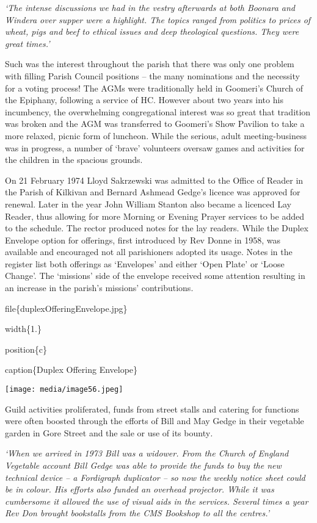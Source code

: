 \emph{`The intense discussions we had in the vestry afterwards at both Boonara and Windera over supper were a highlight. The topics ranged from politics to prices of wheat, pigs and beef to ethical issues and deep theological questions. They were great times.'}

Such was the interest throughout the parish that there was only one problem with filling Parish Council positions -- the many nominations and the necessity for a voting process! The AGMs were traditionally held in Goomeri's Church of the Epiphany, following a service of HC. However about two years into his incumbency, the overwhelming congregational interest was so great that tradition was broken and the AGM was transferred to Goomeri's Show Pavilion to take a more relaxed, picnic form of luncheon. While the serious, adult meeting-business was in progress, a number of `brave' volunteers oversaw games and activities for the children in the spacious grounds.

On 21 February 1974 Lloyd Sakrzewski was admitted to the Office of Reader in the Parish of Kilkivan and Bernard Ashmead Gedge's licence was approved for renewal. Later in the year John William Stanton also became a licenced Lay Reader, thus allowing for more Morning or Evening Prayer services to be added to the schedule. The rector produced notes for the lay readers. While the Duplex Envelope option for offerings, first introduced by Rev Donne in 1958, was available and encouraged not all parishioners adopted its usage. Notes in the register list both offerings as `Envelopes' and either `Open Plate' or `Loose Change'. The `missions' side of the envelope received some attention resulting in an increase in the parish's missions' contributions.

file\{duplexOfferingEnvelope.jpg\}

width\{1.\}

position\{c\}

caption\{Duplex Offering Envelope\}

\texttt{[image: media/image56.jpeg]}

Guild activities proliferated, funds from street stalls and catering for functions were often boosted through the efforts of Bill and May Gedge in their vegetable garden in Gore Street and the sale or use of its bounty\emph{.}

\emph{`When we arrived in 1973 Bill was a widower. From the Church of England Vegetable account Bill Gedge was able to provide the funds to buy the new technical device -- a Fordigraph duplicator -- so now the weekly notice sheet could be in colour. His efforts also funded an overhead projector. While it was cumbersome it allowed the use of visual aids in the services. Several times a year Rev Don brought bookstalls from the CMS Bookshop to all the centres.'}

